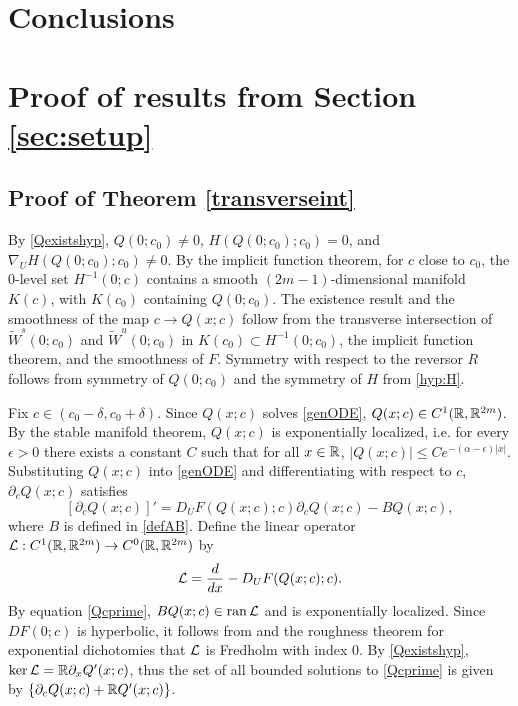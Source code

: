 \documentclass[10pt,reqno]{amsart}
\theoremstyle{plain}
\theoremstyle{definition}
\theoremstyle{remark}
\numberwithin{theorem}{section}
\numberwithin{equation}{section}
\begin{document}
\section{Conclusions}\label{sec:conclusions}

\appendix

\section{Proof of results from Section \ref{sec:setup}}

\subsection{Proof of Theorem \ref{transverseint}}

By \cref{Qexistshyp}, $Q(0; c_0) \neq 0$, $H(Q(0; c_0); c_0) = 0$, and $\nabla_U H(Q(0; c_0); c_0) \neq 0$. By the implicit function theorem, for $c$ close to $c_0$, the 0-level set $H^{-1}(0; c)$ contains a smooth $(2m-1)$-dimensional manifold $K(c)$, with $K(c_0)$ containing $Q(0; c_0)$. The existence result and the smoothness of the map $c \rightarrow Q(x; c)$ follow from the transverse intersection of $\tilde{W}^s(0; c_0)$ and $\tilde{W}^u(0; c_0)$ in $K(c_0) \subset H^{-1}(0; c_0)$, the implicit function theorem, and the smoothness of $F$. Symmetry with respect to the reversor $R$ follows from symmetry of $Q(0; c_0)$ and the symmetry of $H$ from \cref{hyp:H}.

Fix $c \in (c_0 - \delta, c_0 + \delta)$. Since $Q(x; c)$ solves \ref{genODE}, $Q(x; c) \in C^1(\mathbb{R}, \mathbb{R}^{2m})$. By the stable manifold theorem, $Q(x; c)$ is exponentially localized, i.e. for every $\epsilon > 0$ there exists a constant $C$ such that for all $x \in \mathbb{R}$, $|Q(x; c)| \leq C e^{-(\alpha - \epsilon)|x|}$. Substituting $Q(x; c)$ into \cref{genODE} and differentiating with respect to $c$, $\partial_c Q(x; c)$ satisfies
\begin{equation}\label{Qcprime}
[\partial_c Q(x; c)]' = D_U F(Q(x;c); c) \partial_c Q(x; c) - B Q(x;c),
\end{equation}
where $B$ is defined in \cref{defAB}. Define the linear operator $\mathcal{L}: C^1(\mathbb{R}, \mathbb{R}^{2m}) \rightarrow C^0(\mathbb{R}, \mathbb{R}^{2m})$ by
\begin{equation}\label{defLtv}
\mathcal{L} = \frac{d}{dx} - D_U F(Q(x;c); c).
\end{equation}
By equation \cref{Qcprime}, $B Q(x;c) \in \operatorname{ran} \mathcal{L}$ and is exponentially localized. Since $DF(0; c)$ is hyperbolic, it follows from \cite[Lemma~4.2]{Palmer1984} and the roughness theorem for exponential dichotomies \cite{Coppel1978} that $\mathcal{L}$ is Fredholm with index 0. By \cref{Qexistshyp}, $\mathop\mathrm{ker}\nolimits \mathcal{L} = \mathbb{R} \partial_x Q'(x; c)$, thus the set of all bounded solutions to \cref{Qcprime} is given by $\{\partial_c Q(x; c) + \mathbb{R} Q'(x; c)\}$.
\end{document}
